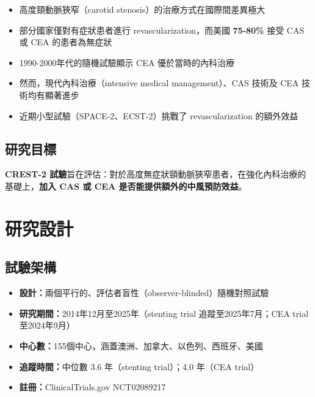 \documentclass[12pt,a4paper]{article}
\begin{document}
\begin{itemize}
    \item 高度頸動脈狹窄（carotid stenosis）的治療方式在國際間差異極大
    \item 部分國家僅對有症狀患者進行 revascularization，而美國 \textbf{75-80\%} 接受 CAS 或 CEA 的患者為無症狀
    \item 1990-2000年代的隨機試驗顯示 CEA 優於當時的內科治療
    \item 然而，現代內科治療（intensive medical management）、CAS 技術及 CEA 技術均有顯著進步
    \item 近期小型試驗（SPACE-2、ECST-2）挑戰了 revascularization 的額外效益
\end{itemize}

\subsection{研究目標}

\textbf{CREST-2 試驗}旨在評估：對於高度無症狀頸動脈狹窄患者，在強化內科治療的基礎上，\textbf{加入 CAS 或 CEA 是否能提供額外的中風預防效益}。

\section{研究設計}

\subsection{試驗架構}

\begin{itemize}
    \item \textbf{設計：}兩個平行的、評估者盲性（observer-blinded）隨機對照試驗
    \item \textbf{研究期間：}2014年12月至2025年（stenting trial 追蹤至2025年7月；CEA trial 至2024年9月）
    \item \textbf{中心數：}155個中心，涵蓋澳洲、加拿大、以色列、西班牙、美國
    \item \textbf{追蹤時間：}中位數 3.6 年（stenting trial）；4.0 年（CEA trial）
    \item \textbf{註冊：}ClinicalTrials.gov NCT02089217
\end{itemize}
\end{document}
